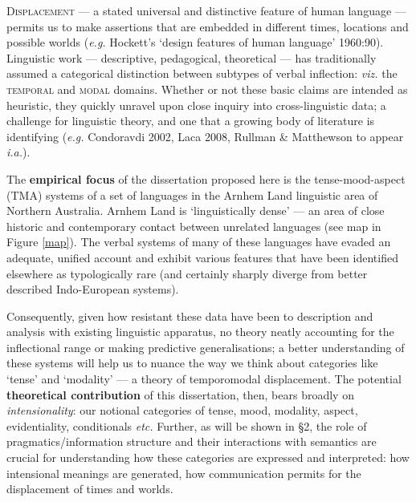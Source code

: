 \lettrine{D}{isplacement} --- a stated universal and distinctive feature of human language ---  permits us to make assertions that are embedded in different times, locations and possible worlds (\textit{e.g.} Hockett's `design features of human language' 1960:90). Linguistic work --- descriptive, pedagogical, theoretical --- has traditionally assumed a categorical distinction between subtypes of verbal inflection: \textit{viz.} the \textsc{temporal} and \textsc{modal} domains. Whether or not these basic claims are intended as heuristic, they quickly unravel upon close inquiry into cross-linguistic data; a challenge for linguistic theory, and one that a growing body of literature is identifying (\textit{e.g. }Condoravdi 2002, Laca 2008, Rullman \& Matthewson to appear \textit{i.a.}).%

The \textbf{empirical focus} of the dissertation proposed here is the tense-mood-aspect (TMA) systems of a set of languages in the Arnhem Land linguistic area of Northern Australia. Arnhem Land is `linguistically dense' --- an area of close historic and contemporary contact between unrelated languages (see map in Figure \ref{map}). The verbal systems of many of these languages have evaded an adequate, unified account and exhibit various features that have been identified elsewhere as typologically rare (and certainly sharply diverge from better described Indo-European systems).

Consequently, given how resistant these data have been to description and analysis with existing linguistic apparatus, no theory neatly accounting for the inflectional range or making predictive generalisations; a better understanding of these systems will help us to nuance the way we think about categories like `tense' and `modality' --- a theory of temporomodal displacement. The potential \textbf{theoretical contribution} of this dissertation, then, bears broadly on \textit{intensionality}: our notional categories of tense, mood, modality, aspect, evidentiality, conditionals \textit{etc.} Further, as will be shown in §2, the role of pragmatics/information structure and their interactions with semantics are crucial for understanding how these categories are expressed and interpreted: how intensional meanings are generated, how communication permits for the displacement of times and worlds.



